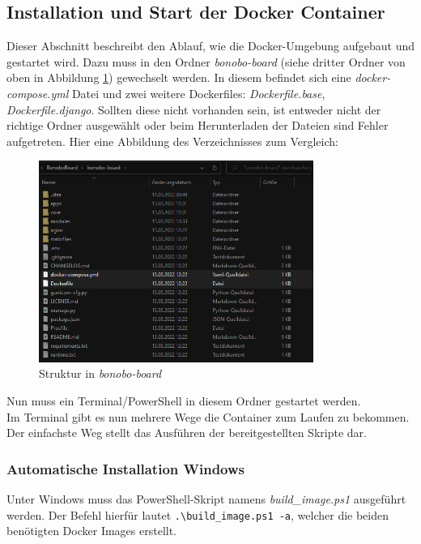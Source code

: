 \documentclass[a4paper,11pt]{scrartcl}
\begin{document}
\subsection{Installation und Start der Docker Container}
Dieser Abschnitt beschreibt den Ablauf, wie die Docker-Umgebung aufgebaut und gestartet wird.
Dazu muss in den Ordner \textit{bonobo-board} (siehe dritter Ordner von oben in Abbildung \ref{img:folder_1}) gewechselt werden.
In diesem befindet sich eine \textit{docker-compose.yml} Datei und zwei weitere Dockerfiles: \textit{Dockerfile.base}, \textit{Dockerfile.django}.
Sollten diese nicht vorhanden sein, ist entweder nicht der richtige Ordner ausgewählt oder beim Herunterladen der Dateien sind Fehler aufgetreten.
Hier eine Abbildung des Verzeichnisses zum Vergleich:
\begin{figure}[H]
\begin{center}
\includegraphics[width=0.8\textwidth]{folder_repo_2}
\caption{Struktur in \textit{bonobo-board}}
\label{img:folder_1}
\end{center}
\end{figure}

\noindent Nun muss ein Terminal/PowerShell in diesem Ordner gestartet werden.\\
Im Terminal gibt es nun mehrere Wege die Container zum Laufen zu bekommen.
Der einfachste Weg stellt das Ausführen der bereitgestellten Skripte dar.

\subsubsection*{Automatische Installation Windows}
Unter Windows muss das PowerShell-Skript namens \textit{build\_image.ps1} ausgeführt werden.
Der Befehl hierfür lautet \texttt{.\textbackslash build\_image.ps1 -a}, welcher die beiden benötigten Docker Images erstellt.
\end{document}
